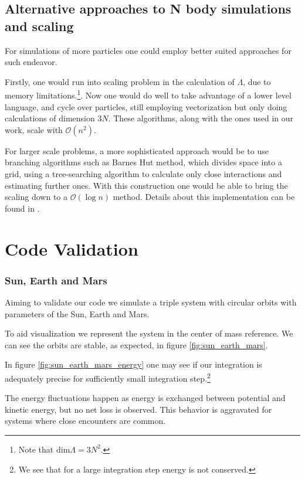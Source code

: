 \documentclass{aa}
\begin{document}
\subsection{Alternative approaches to N body simulations and scaling}

For simulations of more particles one could employ better suited approaches for such
endeavor.

Firstly, one would run into scaling problem in the calculation of $\Lambda$, due to
memory limitations.\footnote{Note that $\text{dim} \Lambda = 3N^2$.}. Now one
would do well to take advantage of a lower level language, and cycle over
particles, still employing vectorization but only doing calculations of
dimension $3N$. These algorithms, along with the ones used in our work, scale
with $\mathcal{O}(n^2)$.

For larger scale problems, a more sophisticated approach would be to use
branching algorithms such as Barnes Hut method, which divides space into a grid,
using a tree-searching algorithm to calculate only close interactions and
estimating further ones. With this construction one would be able to bring the
scaling down to a $\mathcal{O}(\log n)$ method. Details about this
implementation can be found in \cite{iwasawa_implementation_2019}.

\section{Code Validation}

\subsubsection{Sun, Earth and Mars}
\label{sec:sun_earth_mars}

Aiming to validate our code we simulate a triple system with circular orbits
with parameters of the Sun, Earth and Mars.

To aid visualization we represent the system in the center of mass reference. We
can see the orbits are stable, as expected, in figure \ref{fig:sun_earth_mars}.

In figure \ref{fig:sun_earth_mars_energy} one may see if our integration is
adequately precise for sufficiently small integration step.\footnote{We see
  that for a large integration step energy is not conserved.}

The energy fluctuations happen as energy is exchanged between potential and
kinetic energy, but no net loss is observed. This behavior is aggravated for
systems where close encounters are common.
\end{document}
